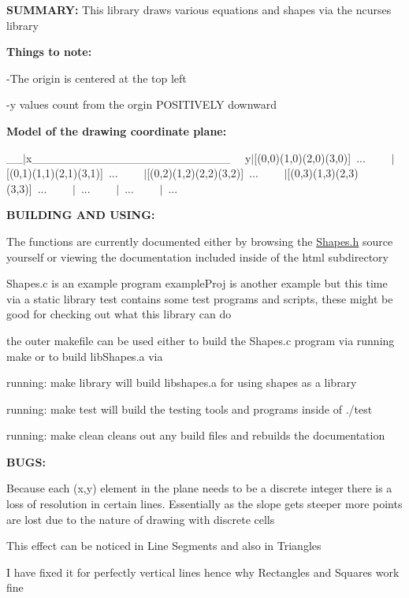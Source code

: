{\bfseries S\+U\+M\+M\+A\+RY\+:} This library draws various equations and shapes via the ncurses library

{\bfseries Things to note\+:} \begin{DoxyVerb}-The origin is centered at the top left

-y values count from the orgin POSITIVELY downward
\end{DoxyVerb}


{\bfseries Model of the drawing coordinate plane\+:}

\+\_\+\+\_\+$\vert$x\+\_\+\+\_\+\+\_\+\+\_\+\+\_\+\+\_\+\+\_\+\+\_\+\+\_\+\+\_\+\+\_\+\+\_\+\+\_\+\+\_\+\+\_\+\+\_\+\+\_\+\+\_\+\+\_\+\+\_\+\+\_\+\+\_\+\+\_\+\+\_\+~\newline
 ~y$\vert$\mbox{[}(0,0)(1,0)(2,0)(3,0)\mbox{]}~...~\newline
 ~~~$\vert$\mbox{[}(0,1)(1,1)(2,1)(3,1)\mbox{]}~...~\newline
 ~~~$\vert$\mbox{[}(0,2)(1,2)(2,2)(3,2)\mbox{]}~...~\newline
 ~~~$\vert$\mbox{[}(0,3)(1,3)(2,3)(3,3)\mbox{]}~...~\newline
 ~~~$\vert$~...~\newline
 ~~~$\vert$~...~\newline
 ~~~$\vert$~...~\newline


{\bfseries B\+U\+I\+L\+D\+I\+NG A\+ND U\+S\+I\+NG\+:}

The functions are currently documented either by browsing the \hyperlink{Shapes_8h}{Shapes.\+h} source yourself or viewing the documentation included inside of the html subdirectory

Shapes.\+c is an example program example\+Proj is another example but this time via a static library test contains some test programs and scripts, these might be good for checking out what this library can do

the outer makefile can be used either to build the Shapes.\+c program via running make or to build lib\+Shapes.\+a via

running\+: \textquotesingle{}make library\textquotesingle{} will build libshapes.\+a for using shapes as a library

running\+: \textquotesingle{}make test\textquotesingle{} will build the testing tools and programs inside of ./test

running\+: \textquotesingle{}make clean\textquotesingle{} cleans out any build files and rebuilds the documentation

{\bfseries B\+U\+GS\+:}

Because each (x,y) element in the plane needs to be a discrete integer there is a loss of \textquotesingle{}resolution\textquotesingle{} in certain lines. Essentially as the slope gets steeper more points are lost due to the nature of drawing with discrete \textquotesingle{}cells\textquotesingle{}

This effect can be noticed in Line Segments and also in Triangles

I have fixed it for perfectly vertical lines hence why Rectangles and Squares work fine 